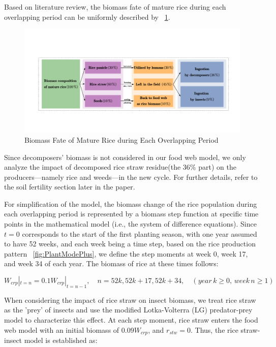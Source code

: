 \documentclass{HZNUMCM}
\begin{document}
        Based on literature review\cite{OLIVER20191139,summers2003biomass}, 
        the biomass fate of mature rice during each overlapping period can be uniformly described by \figurename~\ref{fig:rice_to}. 
        \begin{figure}[H]
          \centering
          \includegraphics[width=\linewidth]{images/rice_to.pdf}
          \caption{Biomass Fate of Mature Rice during Each Overlapping Period}
          \label{fig:rice_to}
        \end{figure}
        Since decomposers' biomass is not considered in our food web model, 
        we only analyze the impact of decomposed rice straw residue(the 36\% part) on the producers—namely rice and weeds—in the new cycle. 
        For further details, refer to the soil fertility section later in the paper.
      
        For simplification of the model, 
        the biomass change of the rice population during each overlapping period is represented 
        by a biomass step function at specific time points in the mathematical model (i.e., the system of difference equations). 
        Since $t=0$ corresponds to the start of the first planting season, with one year assumed to have 52 weeks, 
        and each week being a time step, based on the rice production pattern \figurename~\ref{fig:PlantModePlus}, 
        we define the step moments at week 0, week 17, and week 34 of each year. The biomass of rice at these times follows:

        \begin{equation}
        W_{crp}|_{t=n}=0.1W_{crp}|_{t=n-1}, \quad n = 52k, 52k+17, 52k+34, \quad (year\, k \geqslant 0, \, week\, n \geqslant 1)
        \end{equation}

        When considering the impact of rice straw on insect biomass, 
        we treat rice straw as the 'prey' of insects and use the modified Lotka-Volterra (LG) predator-prey model to characterize this effect. 
        At each step moment, rice straw enters the food web model with an initial biomass of $0.09W_{crp}$, and $r_{stw} = 0$. 
        Thus, the rice straw-insect model is established as:
\end{document}
